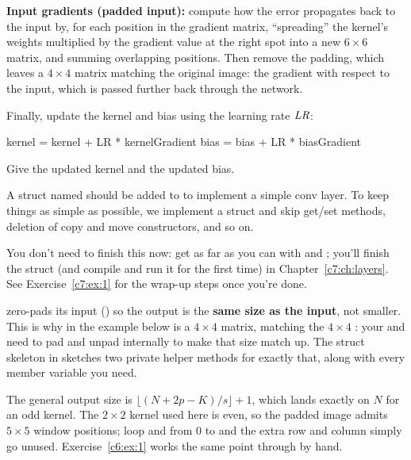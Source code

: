 \textbf{Input gradients (padded input):} compute how the error propagates back to the input by, for
each position in the gradient matrix, ``spreading'' the kernel's weights multiplied by the gradient
value at the right spot into a new $6 \times 6$ matrix, and summing overlapping positions. Then
remove the padding, which leaves a $4 \times 4$ matrix matching the original image: the gradient
with respect to the input, which is passed further back through the network.

Finally, update the kernel and bias using the learning rate $\mathit{LR}$:

\begin{console}
kernel = kernel + LR * kernelGradient
bias   = bias   + LR * biasGradient
\end{console}

\noindent Give the updated kernel and the updated bias.

\label{c6:set:2}\label{c6:app:c}

\label{c6:ex:3}
A struct named  should be added to
 to implement a simple conv layer. To keep things as
simple as possible, we implement a struct and skip get/set methods, deletion of copy and move
constructors, and so on.

You don't need to finish this now: get as far as you can with  and
; you'll finish the struct (and compile and run it for the first time) in
Chapter~\ref{c7:ch:layers}. See Exercise~\ref{c7:ex:1} for the wrap-up steps once you're done.

 zero-pads its input () so the output is the
\textbf{same size as the input}, not smaller. This is why  in the example below
is a $4 \times 4$ matrix, matching the $4 \times 4$ : your  and
 need to pad and unpad internally to make that size match up. The struct
skeleton in  sketches two private helper methods for exactly that, along with
every member variable you need.

The general output size is $\lfloor (N + 2p - K)/s \rfloor + 1$, which lands exactly on $N$ for an
odd kernel. The $2 \times 2$ kernel used here is even, so the padded image admits $5 \times 5$ window
positions; loop  and  from 0 to  and the extra row and column
simply go unused. Exercise~\ref{c6:ex:1} works the same point through by hand.

